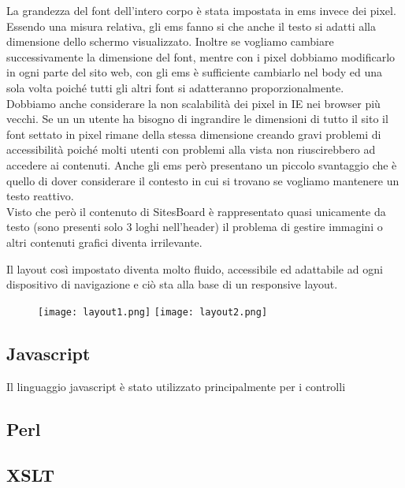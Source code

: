 \documentclass[12pt]{article}
\begin{document}
	La grandezza del font dell'intero corpo è stata impostata in ems invece dei pixel.
	Essendo una misura relativa, gli ems fanno si che anche il testo si adatti alla dimensione dello schermo visualizzato. Inoltre se vogliamo cambiare successivamente la dimensione del font, mentre con i pixel dobbiamo modificarlo in ogni parte del sito web, con gli ems è sufficiente cambiarlo nel body ed una sola volta poiché tutti gli altri font si adatteranno proporzionalmente.\\
	Dobbiamo anche considerare la non scalabilità dei pixel in IE nei browser più vecchi. Se un un utente ha bisogno di ingrandire le dimensioni di tutto il sito il font settato in pixel rimane della stessa dimensione creando gravi problemi di accessibilità poiché molti utenti con problemi alla vista non riuscirebbero ad accedere ai contenuti.
	Anche gli ems però presentano un piccolo svantaggio che è quello di dover considerare il contesto in cui si trovano se vogliamo mantenere un testo reattivo.\\ Visto che però il contenuto di SitesBoard è rappresentato quasi unicamente da testo (sono presenti solo 3 loghi nell'header) il problema di gestire immagini o altri contenuti grafici diventa irrilevante.
	
	Il layout così impostato diventa molto fluido, accessibile ed adattabile ad ogni dispositivo di navigazione e ciò sta alla base di un responsive layout.
	
	\newpage
	
	
	\begin{figure}
	\texttt{[image: layout1.png]}
	\texttt{[image: layout2.png]}
	\hspace{1.5in}
	\end{figure}
	
	\subsection{Javascript}
	
	Il linguaggio javascript è stato utilizzato principalmente per i controlli	
	
	\subsection{Perl}
	
	
	\subsection{XSLT}
\end{document}
